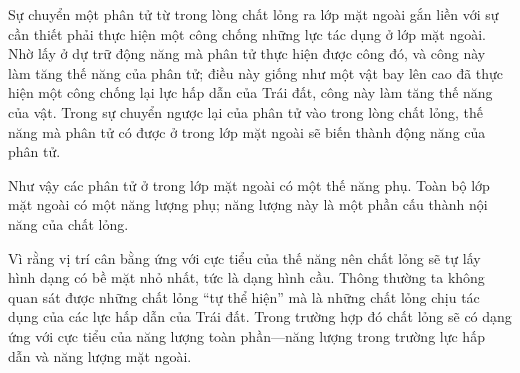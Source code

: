 
Sự chuyển một phân tử từ trong lòng chất lỏng ra lớp mặt ngoài gắn liền với sự cần thiết phải thực hiện một công chống những lực tác dụng ở lớp mặt ngoài. Nhờ lấy ở dự trữ động năng mà phân tử thực hiện được công đó, và công này làm tăng thế năng của phân tử; điều này giống như một vật bay lên cao đã thực hiện một công chống lại lực hấp dẫn của Trái đất, công này làm tăng thế năng của vật. Trong sự chuyển ngược lại của phân tử vào trong lòng chất lỏng, thế năng mà phân tử có được ở trong lớp mặt ngoài sẽ biến thành động năng của phân tử.


Như vậy các phân tử ở trong lớp mặt ngoài có một thế năng phụ. Toàn bộ lớp mặt ngoài có một năng lượng phụ; năng lượng này là một phần cấu thành nội năng của chất lỏng.


Vì rằng vị trí cân bằng ứng với cực tiểu của thế năng nên chất lỏng sẽ tự lấy hình dạng có bề mặt nhỏ nhất, tức là dạng hình cầu. Thông thường ta không quan sát được những chất lỏng ``tự thể hiện'' mà là những chất lỏng chịu tác dụng của các lực hấp dẫn của Trái đất. Trong trường hợp đó chất lỏng sẽ có dạng ứng với cực tiểu của năng lượng toàn phần---năng lượng trong trường lực hấp dẫn và năng lượng mặt ngoài.

